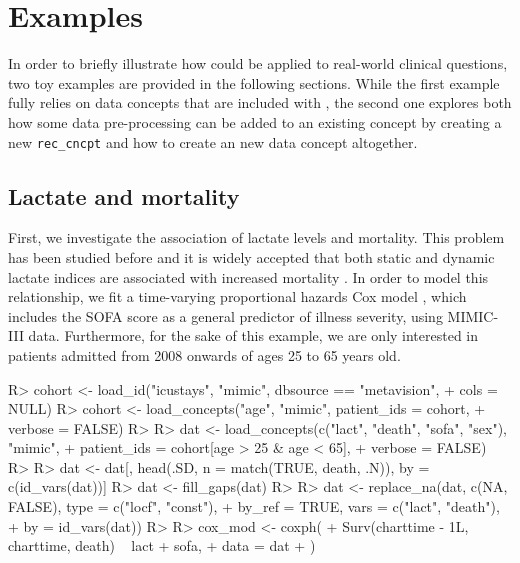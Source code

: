 \documentclass[
  notitle]{jss}
\begin{document}
\hypertarget{examples}{%
\section{Examples}\label{examples}}

In order to briefly illustrate how  could be applied to
real-world clinical questions, two toy examples are provided in the
following sections. While the first example fully relies on data
concepts that are included with , the second one explores both
how some data pre-processing can be added to an existing concept by
creating a new \texttt{rec\_cncpt} and how to create an new data concept
altogether.

\hypertarget{lactate-and-mortality}{%
\subsection{Lactate and mortality}\label{lactate-and-mortality}}

First, we investigate the association of lactate levels and mortality.
This problem has been studied before and it is widely accepted that both
static and dynamic lactate indices are associated with increased
mortality \citep{haas2016, nichol2011, van2013}. In order to model this
relationship, we fit a time-varying proportional hazards Cox model
\citep{therneau2000, therneau2015}, which includes the SOFA score as a
general predictor of illness severity, using MIMIC-III data.
Furthermore, for the sake of this example, we are only interested in
patients admitted from 2008 onwards of ages 25 to 65 years old.

\begin{CodeChunk}
\begin{CodeInput}
R> cohort <- load_id("icustays", "mimic", dbsource == "metavision",
+                   cols = NULL)
R> cohort <- load_concepts("age", "mimic", patient_ids = cohort,
+                         verbose = FALSE)
R> 
R> dat <- load_concepts(c("lact", "death", "sofa", "sex"), "mimic",
+                      patient_ids = cohort[age > 25 & age < 65],
+                      verbose = FALSE)
R> 
R> dat <- dat[, head(.SD, n = match(TRUE, death, .N)), by = c(id_vars(dat))]
R> dat <- fill_gaps(dat)
R> 
R> dat <- replace_na(dat, c(NA, FALSE), type = c("locf", "const"),
+                   by_ref = TRUE, vars = c("lact", "death"),
+                   by = id_vars(dat))
R> 
R> cox_mod <- coxph(
+   Surv(charttime - 1L, charttime, death) ~ lact + sofa,
+   data = dat
+ )
\end{CodeInput}
\end{CodeChunk}
\end{document}
